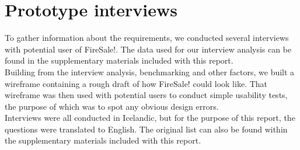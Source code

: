 \section{Prototype interviews}
To gather information about the requirements, we conducted several interviews with potential user of FireSale!. The data used for our interview analysis can be found in the supplementary materials included with this report.\\

Building from the interview analysis, benchmarking and other factors, we built a wireframe containing a rough draft of how FireSale! could look like. That wireframe was then used with potential users to conduct simple usability tests, the purpose of which was to spot any obvious design errors. \\

Interviews were all conducted in Icelandic, but for the purpose of this report, the questions were translated to English. The original list can also be found within the supplementary materials included with this report.
